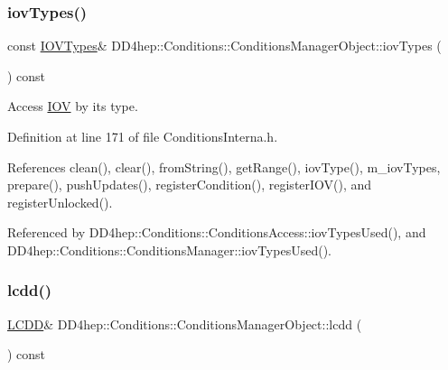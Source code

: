 \subsubsection{\texorpdfstring{iov\+Types()}{iovTypes()}}
{\footnotesize\ttfamily const \hyperlink{class_d_d4hep_1_1_conditions_1_1_conditions_manager_object_a8c3b7d5bdfb7fc6bf6e61ddba5a5f652}{I\+O\+V\+Types}\& D\+D4hep\+::\+Conditions\+::\+Conditions\+Manager\+Object\+::iov\+Types (\begin{DoxyParamCaption}{ }\end{DoxyParamCaption}) const\hspace{0.3cm}{\ttfamily [inline]}}



Access \hyperlink{class_d_d4hep_1_1_i_o_v}{I\+OV} by its type. 



Definition at line 171 of file Conditions\+Interna.\+h.



References clean(), clear(), from\+String(), get\+Range(), iov\+Type(), m\+\_\+iov\+Types, prepare(), push\+Updates(), register\+Condition(), register\+I\+O\+V(), and register\+Unlocked().



Referenced by D\+D4hep\+::\+Conditions\+::\+Conditions\+Access\+::iov\+Types\+Used(), and D\+D4hep\+::\+Conditions\+::\+Conditions\+Manager\+::iov\+Types\+Used().

\hypertarget{class_d_d4hep_1_1_conditions_1_1_conditions_manager_object_a658c9e7b77829462a839c6cbbf383c4e}{}\label{class_d_d4hep_1_1_conditions_1_1_conditions_manager_object_a658c9e7b77829462a839c6cbbf383c4e} 
\subsubsection{\texorpdfstring{lcdd()}{lcdd()}}
{\footnotesize\ttfamily \hyperlink{class_d_d4hep_1_1_geometry_1_1_l_c_d_d}{L\+C\+DD}\& D\+D4hep\+::\+Conditions\+::\+Conditions\+Manager\+Object\+::lcdd (\begin{DoxyParamCaption}{ }\end{DoxyParamCaption}) const\hspace{0.3cm}{\ttfamily [inline]}}



